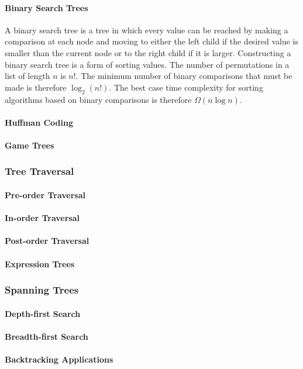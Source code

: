 \documentclass[a4paper, 10pt]{article}
\begin{document}
\paragraph{Binary Search Trees}
A binary search tree is a tree in which every value can be reached by making a comparison at each node and moving to either the left child if the desired value is smaller than the current node or to the right child if it is larger. Constructing a binary search tree is a form of sorting values. The number of permutations in a list of length \(n\) is \(n!\). The minimum number of binary comparisons that must be made is therefore \(\log_2(n!)\). The best case time complexity for sorting algorithms based on binary comparisons is therefore \(\Omega(n\log n)\).
\paragraph{Huffman Coding}

\paragraph{Game Trees}

\subsubsection{Tree Traversal}

\paragraph{Pre-order Traversal}

\paragraph{In-order Traversal}

\paragraph{Post-order Traversal}

\paragraph{Expression Trees}

\subsubsection{Spanning Trees}

\paragraph{Depth-first Search}

\paragraph{Breadth-first Search}

\paragraph{Backtracking Applications}
\end{document}
